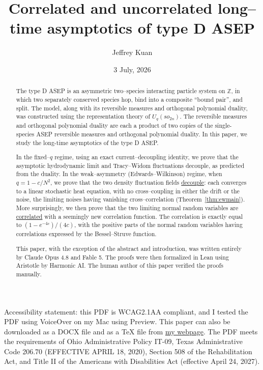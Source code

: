 \documentclass[11pt]{article}
\title{\bf Correlated and uncorrelated long--time asymptotics of type D ASEP}
\author{Jeffrey Kuan}
\date{3 July, 2026}
\theoremstyle{plain}
\theoremstyle{definition}
\theoremstyle{remark}
\newcommand{\Z}{\mathbb{Z}}\newcommand{\R}{\mathbb{R}}\newcommand{\N}{\mathbb{N}}
\begin{document}
Accessibility statement: this PDF is WCAG2.1AA compliant, and I tested the PDF using VoiceOver on my Mac using Preview.  This paper can also be downloaded as a DOCX file and as a TeX file from \href{https://u.osu.edu/jkuanpapers/type_d_asep/}{my webpage}. The PDF meets the requirements of Ohio Administrative Policy IT-09, Texas Administrative Code 206.70 (EFFECTIVE APRIL 18, 2020), Section 508 of the Rehabilitation Act, and Title II of the Americans with Disabilities Act (effective April 24, 2027). 


\maketitle

\begin{abstract}
The type D ASEP is an asymmetric  two--species interacting particle system on $\Z$, in which two separately conserved species hop, bind into a composite ``bound pair'', and split. The model, along with its reversible measures and orthogonal polynomial duality, was constructed using the representation theory of $U_q(so_{2n})$. The reversible measures and orthogonal polynomial duality are each a product of two copies of the single-species ASEP reversible measures and orthogonal polynomial duality. In this paper, we study the long-time asymptotics of the type D ASEP. 

In the fixed--$q$ regime, using an exact current--decoupling identity, we prove that the asymptotic hydrodynamic limit and Tracy--Widom fluctuations decouple, as predicted from the duality. In the weak--asymmetry (Edwards--Wilkinson) regime, when $q=1-c/N^2$, we prove
that the two density fluctuation fields \underline{decouple}: each converges to a linear
stochastic heat equation, with no cross--coupling in either the drift or the noise,
the limiting noises having vanishing cross--correlation (Theorem~\ref{thm:ewmain}).
More surprisingly, we then prove that the two limiting normal random variables are \underline{correlated} with a seemingly new correlation function. The correlation is exactly equal to $(1-e^{-4c})/(4c)$, with the positive parts of the normal random variables having correlations expressed by the Bessel--Struve function. 

This paper, with the exception of the abstract and introduction, was written entirely by Claude Opus 4.8 and Fable 5. The proofs were then formalized in Lean using Aristotle by Harmonic AI. The human author of this paper verified the proofs manually.

\end{abstract}
\end{document}
